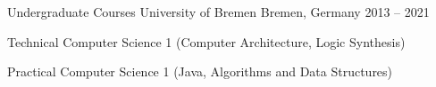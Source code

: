 \begin{cventries}
  \cventry
    {Undergraduate Courses} %
    {University of Bremen} %
    {Bremen, Germany} %
    {2013 -- 2021} %
    {
      \begin{cvitems} %
        \item {Technical Computer Science 1 (Computer Architecture, Logic Synthesis)}
        \item {Practical Computer Science 1 (Java, Algorithms and Data Structures)}
      \end{cvitems}
    }

\end{cventries}
